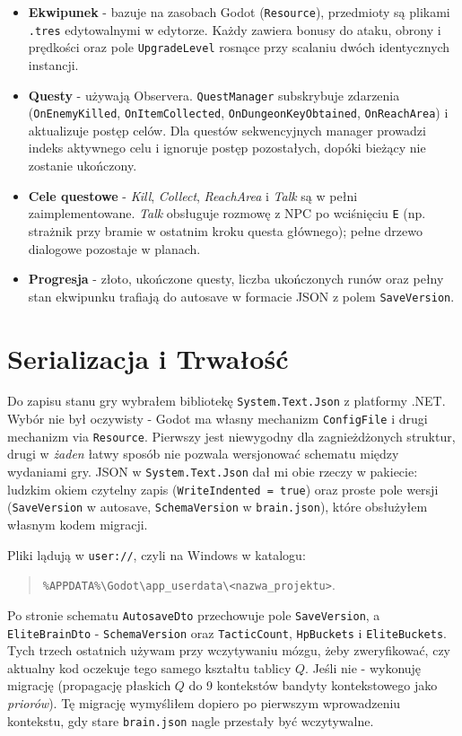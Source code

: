 \begin{itemize}
    \item \textbf{Ekwipunek} - bazuje na zasobach Godot (\texttt{Resource}), przedmioty są plikami \texttt{.tres} edytowalnymi w edytorze. Każdy zawiera bonusy do ataku, obrony i prędkości oraz pole \texttt{UpgradeLevel} rosnące przy scalaniu dwóch identycznych instancji.
    \item \textbf{Questy} - używają Observera. \texttt{QuestManager} subskrybuje zdarzenia (\texttt{OnEnemyKilled}, \texttt{OnItemCollected}, \texttt{OnDungeonKeyObtained}, \texttt{OnReachArea}) i aktualizuje postęp celów. Dla questów sekwencyjnych manager prowadzi indeks aktywnego celu i ignoruje postęp pozostałych, dopóki bieżący nie zostanie ukończony.
    \item \textbf{Cele questowe} - \textit{Kill}, \textit{Collect}, \textit{ReachArea} i \textit{Talk} są w pełni zaimplementowane. \textit{Talk} obsługuje rozmowę z NPC po wciśnięciu \texttt{E} (np. strażnik przy bramie w ostatnim kroku questa głównego); pełne drzewo dialogowe pozostaje w planach.
    \item \textbf{Progresja} - złoto, ukończone questy, liczba ukończonych runów oraz pełny stan ekwipunku trafiają do autosave w formacie JSON z polem \texttt{SaveVersion}.
\end{itemize}

\section{Serializacja i Trwałość}

Do zapisu stanu gry wybrałem bibliotekę \texttt{System.Text.Json} z platformy .NET. Wybór nie był oczywisty - Godot ma własny mechanizm \texttt{ConfigFile} i drugi mechanizm via \texttt{Resource}. Pierwszy jest niewygodny dla zagnieżdżonych struktur, drugi w \emph{żaden} łatwy sposób nie pozwala wersjonować schematu między wydaniami gry. JSON w \texttt{System.Text.Json} dał mi obie rzeczy w pakiecie: ludzkim okiem czytelny zapis (\texttt{WriteIndented = true}) oraz proste pole wersji (\texttt{SaveVersion} w autosave, \texttt{SchemaVersion} w \texttt{brain.json}), które obsłużyłem własnym kodem migracji.

Pliki lądują w \texttt{user://}, czyli na Windows w katalogu:
\begin{quote}
\texttt{\%APPDATA\%\textbackslash{}Godot\textbackslash{}app\_userdata\textbackslash{}\linebreak<nazwa\_projektu>}.
\end{quote}
Po stronie schematu \texttt{AutosaveDto} przechowuje pole \texttt{SaveVersion}, a \texttt{EliteBrainDto} - \texttt{SchemaVersion} oraz \texttt{TacticCount}, \texttt{HpBuckets} i \texttt{EliteBuckets}. Tych trzech ostatnich używam przy wczytywaniu mózgu, żeby zweryfikować, czy aktualny kod oczekuje tego samego kształtu tablicy $Q$. Jeśli nie - wykonuję migrację (propagację płaskich $Q$ do 9 kontekstów bandyty kontekstowego jako \emph{priorów}). Tę migrację wymyśliłem dopiero po pierwszym wprowadzeniu kontekstu, gdy stare \texttt{brain.json} nagle przestały być wczytywalne.

